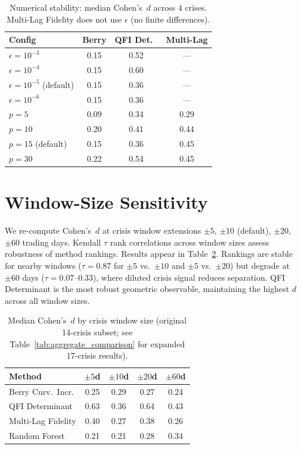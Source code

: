 \documentclass[3p]{elsarticle}
\begin{document}
\begin{table}[htb]
\centering
\caption{Numerical stability: median Cohen's~$d$ across 4 crises.
Multi-Lag Fidelity does not use $\epsilon$ (no finite differences).}
\label{tab:stability}
\small
\begin{tabular}{lccc}
\toprule
Config & Berry & QFI Det.\ & Multi-Lag \\
\midrule
$\epsilon = 10^{-3}$ & 0.15 & 0.52 & --- \\
$\epsilon = 10^{-4}$ & 0.15 & 0.60 & --- \\
$\epsilon = 10^{-5}$ (default) & 0.15 & 0.36 & --- \\
$\epsilon = 10^{-6}$ & 0.15 & 0.36 & --- \\
\midrule
$p = 5$  & 0.09 & 0.34 & 0.29 \\
$p = 10$ & 0.20 & 0.41 & 0.44 \\
$p = 15$ (default) & 0.15 & 0.36 & 0.45 \\
$p = 30$ & 0.22 & 0.54 & 0.45 \\
\bottomrule
\end{tabular}
\end{table}

\section{Window-Size Sensitivity}\label{sec:window_sensitivity}

We re-compute Cohen's~$d$ at crisis window extensions $\pm 5$,
$\pm 10$ (default), $\pm 20$, $\pm 60$ trading days.  Kendall $\tau$
rank correlations across window sizes assess robustness of method
rankings.  Results appear in Table~\ref{tab:window}.  Rankings are
stable for nearby windows ($\tau = 0.87$ for $\pm 5$ vs.\ $\pm 10$
and $\pm 5$ vs.\ $\pm 20$) but degrade at $\pm 60$ days
($\tau = 0.07$--$0.33$), where diluted crisis signal reduces
separation.  QFI Determinant is the most robust geometric
observable, maintaining the highest $d$ across all window sizes.

\begin{table}[htb]
\centering
\caption{Median Cohen's~$d$ by crisis window size (original 14-crisis subset; see Table~\ref{tab:aggregate_comparison} for expanded 17-crisis results).}
\label{tab:window}
\small
\begin{tabular}{lcccc}
\toprule
Method & $\pm 5$d & $\pm 10$d & $\pm 20$d & $\pm 60$d \\
\midrule
Berry Curv.\ Incr.  & 0.25 & 0.29 & 0.27 & 0.24 \\
QFI Determinant      & 0.63 & 0.36 & 0.64 & 0.43 \\
Multi-Lag Fidelity   & 0.40 & 0.27 & 0.38 & 0.26 \\
Random Forest        & 0.21 & 0.21 & 0.28 & 0.34 \\
\bottomrule
\end{tabular}
\end{table}
\end{document}
